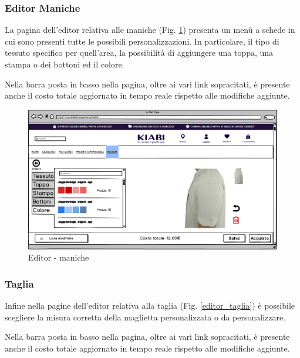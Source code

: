 \documentclass[12pt,italian,]{report}
\begin{document}
\newpage
\subsubsection{Editor Maniche} 

La pagina dell'editor relativa alle maniche (Fig. \ref{editor_maniche}) presenta un menù a schede in cui sono presenti tutte le possibili personalizzazioni. In particolare, il tipo di tessuto specifico per quell'area, la possibilità di aggiungere una toppa, una stampa o dei bottoni ed il colore.

Nella barra posta in basso nella pagina, oltre ai vari link sopracitati, è presente anche il costo totale aggiornato in tempo reale rispetto alle modifiche aggiunte.

\begin{figure}[h]
\centering
\includegraphics{../../balsamiq/balsamiq_finale/Editor-caratteristicamanichecolore.png}
\caption{Editor - maniche}
\label{editor_maniche}
\end{figure}

\newpage
\subsubsection{Taglia} 

Infine nella pagine dell'editor relativa alla taglia (Fig. \ref{editor_taglia}) è possibile scegliere la misura corretta della maglietta personalizzata o da personalizzare.

Nella barra posta in basso nella pagina, oltre ai vari link sopracitati, è presente anche il costo totale aggiornato in tempo reale rispetto alle modifiche aggiunte.
\end{document}

